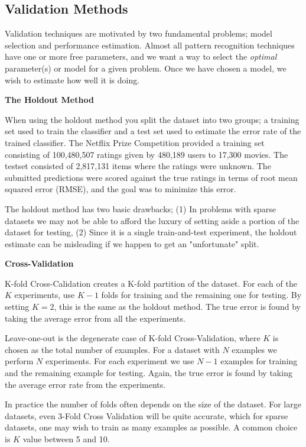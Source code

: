 \subsection{Validation Methods}

Validation techniques are motivated by two fundamental problems; model selection and performance estimation. Almost all pattern recognition techniques have one or more free parameters, and we want a way to select the \emph{optimal} parameter(s) or model for a given problem. Once we have chosen a model, we wish to estimate how well it is doing.

\textbf{The Holdout Method}

When using the holdout method you split the dataset into two groups; a training set used to train the classifier and a test set used to estimate the error rate of the trained classifier. The Netflix Prize Competition \cite{Netflix} provided a training set consisting of 100,480,507 ratings given by 480,189 users to 17,300 movies. The testset consisted of 2,817,131 items where the ratings were unknown. The submitted predictions were scored against the true ratings in terms of root mean squared error (RMSE), and the goal was to minimize this error.

The holdout method has two basic drawbacks; (1) In problems with sparse datasets we may not be able to afford the luxury of setting aside a portion of the dataset for testing, (2) Since it is a single train-and-test experiment, the holdout estimate can be misleading if we happen to get an "unfortunate" split.

\textbf{Cross-Validation}

K-fold Cross-Calidation creates a K-fold partition of the dataset. For each of the $K$ experiments, use $K-1$ folds for training and the remaining one for testing. By setting $K=2$, this is the same as the holdout method. The true error is found by taking the average error from all the experiments.

Leave-one-out is the degenerate case of K-fold Cross-Validation, where $K$ is chosen as the total number of examples. For a dataset with $N$ examples we perform $N$ experiments. For each experiment we use $N-1$ examples for training and the remaining example for testing. Again, the true error is found by taking the average error rate from the experiments.

In practice the number of folds often depends on the size of the dataset. For large datasets, even 3-Fold Cross Validation will be quite accurate, which for sparse datasets, one may wish to train as many examples as possible. A common choice is $K$ value between 5 and 10.

